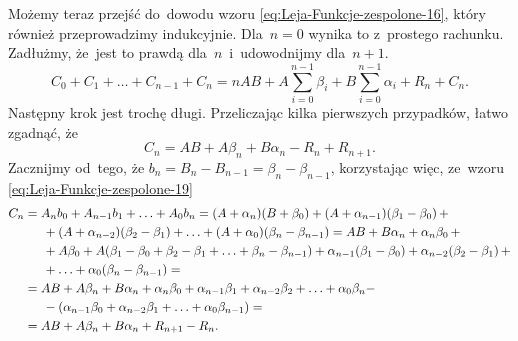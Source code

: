 \documentclass[a4paper,11pt]{article}
\begin{document}
Możemy teraz przejść do~dowodu wzoru \eqref{eq:Leja-Funkcje-zespolone-16},
który również przeprowadzimy indukcyjnie. Dla~$n = 0$ wynika to z~prostego
rachunku. Zadłużmy, że~jest to prawdą dla~$n$~i~udowodnijmy dla~$n + 1$.
\begin{equation}
  \label{eq:Leja-Funkcje-zespolone-24}
  C_{ 0 } + C_{ 1 } + \ldots + C_{ n - 1 } + C_{ n } =
  n AB + A \sum_{ i = 0 }^{ n - 1 } \beta_{ i } + B \sum_{ i = 0 }^{ n - 1 }
  \alpha_{ i } + R_{ n } + C_{ n }.
\end{equation}
Następny krok jest trochę długi. Przeliczając kilka pierwszych
przypadków, łatwo zgadnąć, że
\begin{equation}
  \label{eq:Leja-Funkcje-zespolone-25}
  C_{ n } = AB + A \beta_{ n } + B \alpha_{ n } - R_{ n } + R_{ n + 1 }.
\end{equation}
Zacznijmy od~tego, że
$b_{ n } = B_{ n } - B_{ n - 1 } = \beta_{ n } - \beta_{ n - 1 }$,
korzystając więc, ze~wzoru \eqref{eq:Leja-Funkcje-zespolone-19}
\begin{equation}
  \label{eq:Leja-Funkcje-zespolone-26}
  \begin{split}
    C_{ n }
    &= A_{ n } b_{ 0 } + A_{ n - 1 } b_{ 1 } + \ldots + A_{ 0 }
      b_{ n } = ( A + \alpha_{ n } ) ( B + \beta_{ 0 } ) + ( A + \alpha_{ n - 1 } )
      ( \beta_{ 1 } - \beta_{ 0 } ) \, + \\
    &\hspace{1.5em} + ( A + \alpha_{ n - 2 } )( \beta_{ 2 } - \beta_{ 1 } ) + \ldots
      + ( A + \alpha_{ 0 } ) ( \beta_{ n } - \beta_{ n - 1 } ) =
      AB + B \alpha_{ n } + \alpha_{ n } \beta_{ 0 } \, + \\
    &\hspace{1.5em} + A \beta_{ 0 } + A ( \beta_{ 1 } - \beta_{ 0 } + \beta_{ 2 }
      - \beta_{ 1 } + \ldots + \beta_{ n } - \beta_{ n - 1 } ) + \alpha_{ n - 1 } ( \beta_{ 1 } - \beta_{ 0 } )
      + \alpha_{ n - 2 } ( \beta_{ 2 } - \beta_{ 1 } ) \, + \\
    &\hspace{1.5em} + \ldots + \alpha_{ 0 } ( \beta_{ n } - \beta_{ n - 1 } ) = \\
    &=
      AB + A \beta_{ n } + B \alpha_{ n } + \alpha_{ n } \beta_{ 0 } + \alpha_{ n - 1 } \beta_{ 1 }
      + \alpha_{ n - 2 } \beta_{ 2 } + \ldots + \alpha_{ 0 } \beta_{ n } - \\
    &\hspace{1.5em} - ( \alpha_{ n - 1 } \beta_{ 0 } + \alpha_{ n - 2 } \beta_{ 1 }
      + \ldots + \alpha_{ 0 } \beta_{ n - 1 } ) = \\
    &= AB + A \beta_{ n } + B \alpha_{ n } + R_{ n + 1 } - R_{ n }.
  \end{split}
\end{equation}
\end{document}
